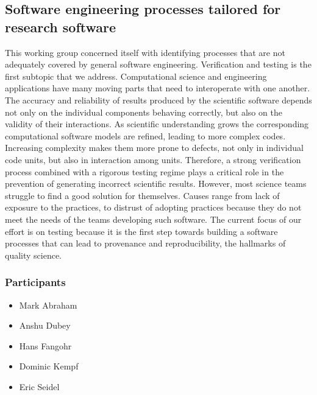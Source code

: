 \subsection{Software engineering processes tailored for research software}
\label{sec:soft-eng}


This working group concerned itself with identifying processes that are not adequately
covered by general software engineering. Verification and testing is
the first subtopic that we address.  
Computational science and engineering applications have many moving
parts that need to interoperate with one another. The accuracy and
reliability of results produced by the scientific software depends not
only on the individual components behaving correctly, but also on the
validity of their interactions. 
As scientific understanding grows
the corresponding computational software models are refined, leading
to more complex codes. Increasing complexity makes them more prone to
defects, not only in individual code units, but also in interaction
among units. Therefore, a strong verification process combined with a
rigorous testing regime plays a critical role in the prevention of
generating incorrect scientific results. However, most science teams
struggle to find a good solution for themselves. Causes range from
lack of exposure to the practices, to distrust of adopting practices
because they do not meet the needs of the teams developing such
software.  The current focus of our effort is on testing because it is the first step
towards building a software processes that can lead to provenance and
reproducibility, the hallmarks of quality science. 

\subsubsection{Participants}
\begin{itemize}
\item Mark Abraham
\item Anshu Dubey 
\item Hans Fangohr
\item Dominic Kempf
\item Eric Seidel
\end{itemize}

